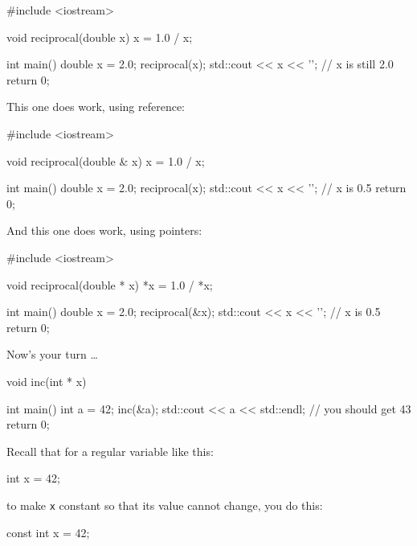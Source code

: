 \begin{consolethree}[escapeinside=||]
#include <iostream>

void reciprocal(double x)
{
    x = 1.0 / x;
}

int main()
{
    double x = 2.0;
    reciprocal(x);
    std::cout << x << '\n';     // x is still 2.0
    return 0;
}
\end{consolethree}
This one does work, using reference:

\begin{consolethree}[escapeinside=||]
#include <iostream>

void reciprocal(double & x)
{
    x = 1.0 / x;
}

int main()
{
    double x = 2.0;
    reciprocal(x);
    std::cout << x << '\n';     // x is 0.5
    return 0;
}
\end{consolethree}
And this one does work, using pointers:

\begin{consolethree}[escapeinside=||]
#include <iostream>

void reciprocal(double * x)
{
    *x = 1.0 / *x;
}

int main()
{
    double x = 2.0;
    reciprocal(&x);
    std::cout << x << '\n';     // x is 0.5
    return 0;
}
\end{consolethree}
Now's your turn \ldots{}


\begin{consolethree}[escapeinside=||]
void inc(int * x)
{
}

int main()
{
    int a = 42;
    inc(&a);
    std::cout << a << std::endl;    // you should get 43
    return 0;
}
\end{consolethree}



\newpage{}

Recall that for a regular variable like this:

\begin{consolethree}[escapeinside=||]
int x = 42;
\end{consolethree}

to make \texttt{x} constant so that its value cannot change, you do this:

\begin{consolethree}[escapeinside=||]
const int x = 42;
\end{consolethree}

